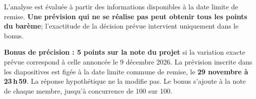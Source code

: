 \documentclass[11pt,letterpaper]{article}
\begin{document}
L'analyse est évaluée à partir des informations disponibles à la date limite de remise. \textbf{Une prévision qui ne se réalise pas peut obtenir tous les points du barème}; l'exactitude de la décision prévue intervient uniquement dans le bonus.

\textbf{Bonus de précision : 5 points sur la note du projet} si la variation exacte prévue correspond à celle annoncée le 9 décembre 2026. La prévision inscrite dans les diapositives est figée à la date limite commune de remise, le \textbf{29 novembre à 23\,h\,59}. La réponse hypothétique ne la modifie pas. Le bonus s'ajoute à la note de chaque membre, jusqu'à concurrence de 100 sur 100.
\end{document}
